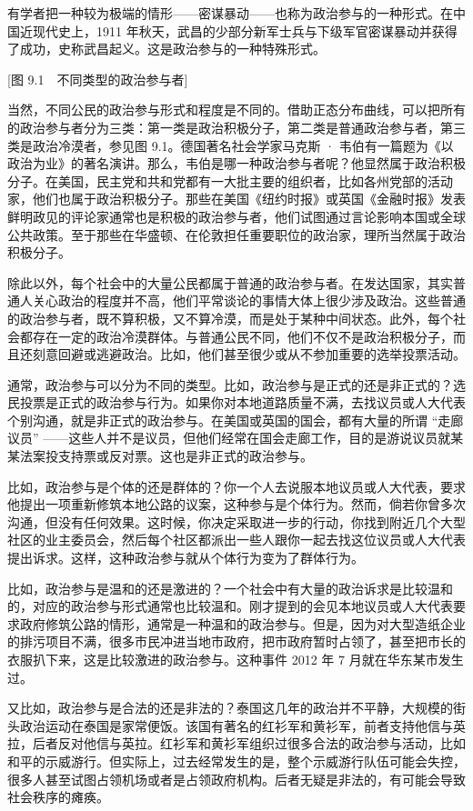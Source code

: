 有学者把一种较为极端的情形——密谋暴动——也称为政治参与的一种形式。在中国近现代史上，1911 年秋天，武昌的少部分新军士兵与下级军官密谋暴动并获得了成功，史称武昌起义。这是政治参与的一种特殊形式。

[图 9.1　不同类型的政治参与者]

当然，不同公民的政治参与形式和程度是不同的。借助正态分布曲线，可以把所有的政治参与者分为三类：第一类是政治积极分子，第二类是普通政治参与者，第三类是政治冷漠者，参见图 9.1。德国著名社会学家马克斯 · 韦伯有一篇题为《以政治为业》的著名演讲。那么，韦伯是哪一种政治参与者呢？他显然属于政治积极分子。在美国，民主党和共和党都有一大批主要的组织者，比如各州党部的活动家，他们也属于政治积极分子。那些在美国《纽约时报》或英国《金融时报》发表鲜明政见的评论家通常也是积极的政治参与者，他们试图通过言论影响本国或全球公共政策。至于那些在华盛顿、在伦敦担任重要职位的政治家，理所当然属于政治积极分子。

除此以外，每个社会中的大量公民都属于普通的政治参与者。在发达国家，其实普通人关心政治的程度并不高，他们平常谈论的事情大体上很少涉及政治。这些普通的政治参与者，既不算积极，又不算冷漠，而是处于某种中间状态。此外，每个社会都存在一定的政治冷漠群体。与普通公民不同，他们不仅不是政治积极分子，而且还刻意回避或逃避政治。比如，他们甚至很少或从不参加重要的选举投票活动。

通常，政治参与可以分为不同的类型。比如，政治参与是正式的还是非正式的？选民投票是正式的政治参与行为。如果你对本地道路质量不满，去找议员或人大代表个别沟通，就是非正式的政治参与。在美国或英国的国会，都有大量的所谓 “走廊议员” ——这些人并不是议员，但他们经常在国会走廊工作，目的是游说议员就某某法案投支持票或反对票。这也是非正式的政治参与。

比如，政治参与是个体的还是群体的？你一个人去说服本地议员或人大代表，要求他提出一项重新修筑本地公路的议案，这种参与是个体行为。然而，倘若你曾多次沟通，但没有任何效果。这时候，你决定采取进一步的行动，你找到附近几个大型社区的业主委员会，然后每个社区都派出一些人跟你一起去找这位议员或人大代表提出诉求。这样，这种政治参与就从个体行为变为了群体行为。

比如，政治参与是温和的还是激进的？一个社会中有大量的政治诉求是比较温和的，对应的政治参与形式通常也比较温和。刚才提到的会见本地议员或人大代表要求政府修筑公路的情形，通常是一种温和的政治参与。但是，因为对大型造纸企业的排污项目不满，很多市民冲进当地市政府，把市政府暂时占领了，甚至把市长的衣服扒下来，这是比较激进的政治参与。这种事件 2012 年 7 月就在华东某市发生过。

又比如，政治参与是合法的还是非法的？泰国这几年的政治并不平静，大规模的街头政治运动在泰国是家常便饭。该国有著名的红衫军和黄衫军，前者支持他信与英拉，后者反对他信与英拉。红衫军和黄衫军组织过很多合法的政治参与活动，比如和平的示威游行。但实际上，过去经常发生的是，整个示威游行队伍可能会失控，很多人甚至试图占领机场或者是占领政府机构。后者无疑是非法的，有可能会导致社会秩序的瘫痪。

